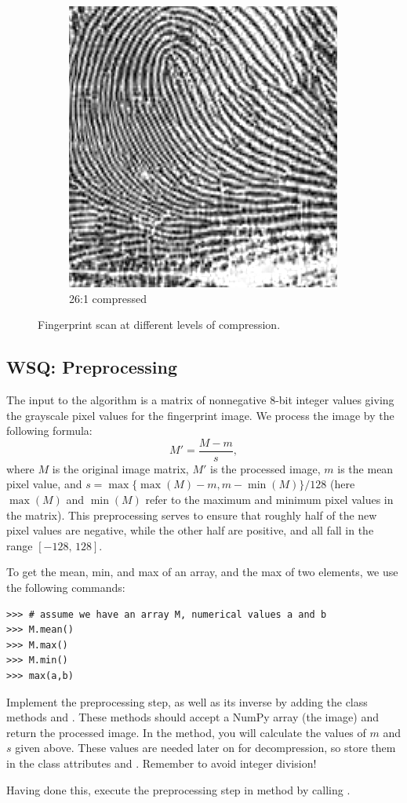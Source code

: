 \begin{figure}
\begin{subfigure}{.32\textwidth}
  \includegraphics[width=.7\linewidth]{compressed_finger(60comp).png}
  \caption{26:1 compressed}
  \label{fig:sub2}
\end{subfigure}
\caption{Fingerprint scan at different levels of compression.}
\label{fig:finger_compression}
\end{figure}

\subsection*{WSQ: Preprocessing}
The input to the algorithm is a matrix of nonnegative 8-bit integer values giving
the grayscale pixel values for the fingerprint image. We process the image
by the following formula:
\[
M' = \frac{M-m}{s},
\]
where $M$ is the original image matrix, $M'$ is the processed image,
$m$ is the mean pixel value, and $s = \max\{\max(M) - m, m - \min(M)\}/128$
(here $\max(M)$ and $\min(M)$ refer to the maximum and minimum pixel values
in the matrix). This preprocessing serves to ensure that roughly half of the
new pixel values are negative, while the other half are positive, and all fall
in the range $[-128,\,128]$.

To get the mean, min, and max of an array, and the max of two elements,
we use the following commands:
\begin{lstlisting}
>>> # assume we have an array M, numerical values a and b
>>> M.mean()
>>> M.max()
>>> M.min()
>>> max(a,b)
\end{lstlisting}
\begin{problem}
Implement the preprocessing step, as well as its inverse by adding the class methods
 and .
These methods should accept a NumPy array (the image) and return the processed image.
In the  method, you will calculate the values of $m$ and $s$ given above.
These values are needed later on for decompression, so store them in the class attributes  and .
Remember to avoid integer division!

Having done this, execute the preprocessing step in  method by calling .
\end{problem}

